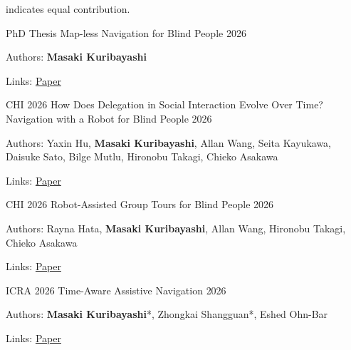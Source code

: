 
\begin{cvparagraph}
\textasteriskcentered{} indicates equal contribution.
\end{cvparagraph}


\begin{cventries}

  \cventry
    {PhD Thesis}
    {Map-less Navigation for Blind People}
    {}
    {2026}
    {
      \begin{cvitems}
        \item {Authors: \textbf{Masaki Kuribayashi}}
        \item {Links: \href{https://www.masakikuribayashi.com/data/project/masaki_kuribayashi_phd_thesis_2026/paper.pdf}{Paper}}
      \end{cvitems}
    }

  \cventry
    {CHI 2026}
    {How Does Delegation in Social Interaction Evolve Over Time? Navigation with a Robot for Blind People}
    {}
    {2026}
    {
      \begin{cvitems}
        \item {Authors: Yaxin Hu, \textbf{Masaki Kuribayashi}, Allan Wang, Seita Kayukawa, Daisuke Sato, Bilge Mutlu, Hironobu Takagi, Chieko Asakawa}
        \item {Links: \href{https://www.masakikuribayashi.com/data/project/yaxin_hu_chi_2026/paper.pdf}{Paper}}
      \end{cvitems}
    }

  \cventry
    {CHI 2026}
    {Robot-Assisted Group Tours for Blind People}
    {}
    {2026}
    {
      \begin{cvitems}
        \item {Authors: Rayna Hata, \textbf{Masaki Kuribayashi}, Allan Wang, Hironobu Takagi, Chieko Asakawa}
        \item {Links: \href{https://www.masakikuribayashi.com/data/project/rayna_hata_chi_2026/paper.pdf}{Paper}}
      \end{cvitems}
    }

  \cventry
    {ICRA 2026}
    {Time-Aware Assistive Navigation}
    {}
    {2026}
    {
      \begin{cvitems}
        \item {Authors: \textbf{Masaki Kuribayashi}*, Zhongkai Shangguan*, Eshed Ohn-Bar}
        \item {Links: \href{https://www.masakikuribayashi.com/data/project/masaki_kuribayashi_icra_2026/paper.pdf}{Paper}}
      \end{cvitems}
    }


\end{cventries}
